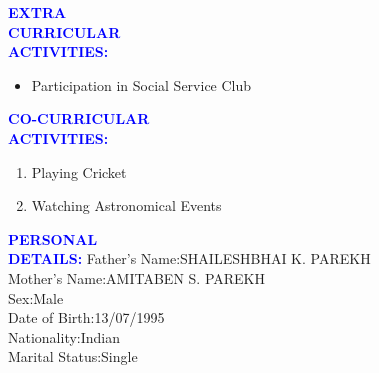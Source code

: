 \documentclass{article}
\begin{document}
\begin{flushleft}
	\textcolor{blue}{\textbf{EXTRA\\ CURRICULAR\\ ACTIVITIES:}}
	\begin{itemize}
		\vspace{-0.29in}
		\addtolength{\itemindent}{1.0in}
		\item Participation in Social Service Club 
	\end{itemize}
\end{flushleft}
\begin{flushleft}
	\textcolor{blue}{\textbf{CO-CURRICULAR\\ ACTIVITIES:}}
	\begin{enumerate}
		\vspace{-0.29in}
		\addtolength{\itemindent}{1.0in}
		\item Playing Cricket
		\item Watching Astronomical Events
	\end{enumerate}
\end{flushleft}
\begin{flushleft}
	\textcolor{blue}{\textbf{PERSONAL\\ DETAILS:}}
	\hspace{1.02in}
	Father's Name:\hspace{0.1in}SHAILESHBHAI K. PAREKH\\	
	\hspace{1.8in}
	Mother's Name:\hspace{0.06in}AMITABEN S. PAREKH\\
	\hspace{1.8in}
	Sex:\hspace{0.78in}Male\\
	\hspace{1.8in}
	Date of Birth:\hspace{0.16in}13/07/1995\\
	\hspace{1.8in}
	Nationality:\hspace{0.3in}Indian\\
	\hspace{1.8in}
	Marital Status:\hspace{0.1in}Single\\
\end{flushleft}
\end{document}

